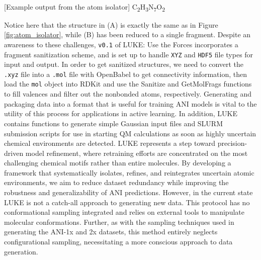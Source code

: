 \begin{flushleft}
\begin{multiFigure}
\begin{centering}
    \\
[Example output from the atom isolator]{
C\textsubscript{2}H\textsubscript{3}N\textsubscript{7}O\textsubscript{2} 
}
\label{fig:sanitization}
\end{centering}
\end{multiFigure}
\end{flushleft}

Notice here that the structure in (A) is exactly the same as in Figure \ref{fig:atom_isolator}, while (B) has been reduced to a single fragment.
Despite an awareness to these challenges, \verb|v0.1| of LUKE: Use the Forces incorporates a fragment sanitization scheme, and is set up to handle \verb|XYZ| and \verb|HDF5| file types for input and output. 
In order to get sanitized structures, we need to convert the \verb|.xyz| file into a \verb|.mol| file with OpenBabel \cite{babel} to get connectivity information, then load the \verb|mol| object into RDKit and use the Sanitize and GetMolFrags functions to fill valences and filter out the nonbonded atoms, respectively.
Generating and packaging data into a format that is useful for training ANI models is vital to the utility of this process for applications in active learning.
In addition, LUKE contains functions to generate simple Gaussian \cite{gaussian16} input files and SLURM \cite{slurm} submission scripts for use in starting QM calculations as soon as highly uncertain chemical environments are detected.
LUKE represents a step toward precision-driven model refinement, where retraining efforts are concentrated on the most challenging chemical motifs rather than entire molecules. 
By developing a framework that systematically isolates, refines, and reintegrates uncertain atomic environments, we aim to reduce dataset redundancy while improving the robustness and generalizability of ANI predictions.
However, in the current state LUKE is not a catch-all approach to generating new data.
This protocol has no conformational sampling integrated and relies on external tools to manipulate molecular conformations.
Further, as with the sampling techniques used in generating the ANI-1x \cite{1x_1ccx_datasets} and 2x \cite{2x_dataset} datasets, this method entirely neglects configurational sampling, necessitating a more conscious approach to data generation.


